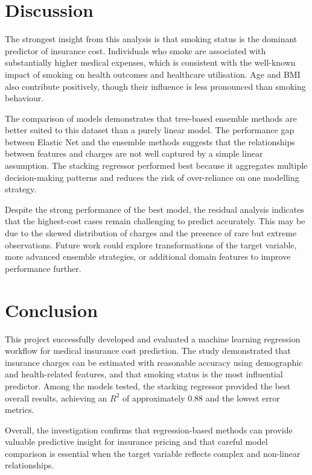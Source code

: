 \chapter{Discussion}
The strongest insight from this analysis is that smoking status is the dominant predictor of insurance cost. Individuals who smoke are associated with substantially higher medical expenses, which is consistent with the well-known impact of smoking on health outcomes and healthcare utilisation. Age and BMI also contribute positively, though their influence is less pronounced than smoking behaviour.

The comparison of models demonstrates that tree-based ensemble methods are better suited to this dataset than a purely linear model. The performance gap between Elastic Net and the ensemble methods suggests that the relationships between features and charges are not well captured by a simple linear assumption. The stacking regressor performed best because it aggregates multiple decision-making patterns and reduces the risk of over-reliance on one modelling strategy.

Despite the strong performance of the best model, the residual analysis indicates that the highest-cost cases remain challenging to predict accurately. This may be due to the skewed distribution of charges and the presence of rare but extreme observations. Future work could explore transformations of the target variable, more advanced ensemble strategies, or additional domain features to improve performance further.

\chapter{Conclusion}
This project successfully developed and evaluated a machine learning regression workflow for medical insurance cost prediction. The study demonstrated that insurance charges can be estimated with reasonable accuracy using demographic and health-related features, and that smoking status is the most influential predictor. Among the models tested, the stacking regressor provided the best overall results, achieving an $R^2$ of approximately 0.88 and the lowest error metrics.

Overall, the investigation confirms that regression-based methods can provide valuable predictive insight for insurance pricing and that careful model comparison is essential when the target variable reflects complex and non-linear relationships.
